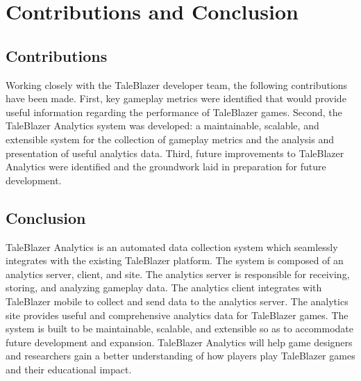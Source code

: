 \chapter{Contributions and Conclusion}

\section{Contributions}

Working closely with the TaleBlazer developer team, the following contributions have been made. First, key gameplay metrics were identified that would provide useful information regarding the performance of TaleBlazer games. Second, the TaleBlazer Analytics system was developed: a maintainable, scalable, and extensible system for the collection of gameplay metrics and the analysis and presentation of useful analytics data. Third, future improvements to TaleBlazer Analytics were identified and the groundwork laid in preparation for future development. 

\section{Conclusion}

TaleBlazer Analytics is an automated data collection system which seamlessly integrates with the existing TaleBlazer platform. The system is composed of an analytics server, client, and site. The analytics server is responsible for receiving, storing, and analyzing gameplay data. The analytics client integrates with TaleBlazer mobile to collect and send data to the analytics server. The analytics site provides useful and comprehensive analytics data for TaleBlazer games. The system is built to be maintainable, scalable, and extensible so as to accommodate future development and expansion. TaleBlazer Analytics will help game designers and researchers gain a better understanding of how players play TaleBlazer games and their educational impact.
